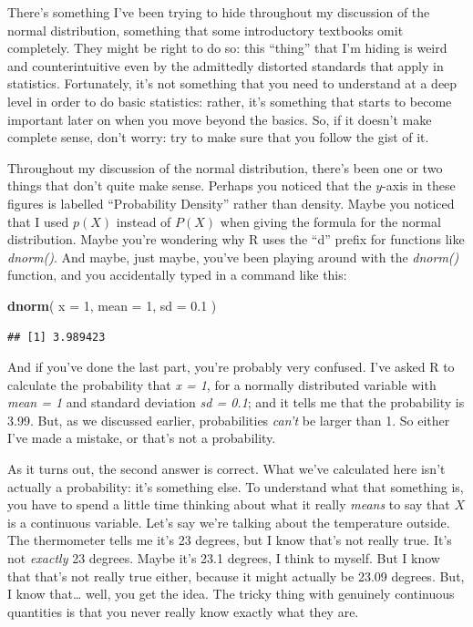 \documentclass[
]{book}
\newenvironment{Shaded}{\begin{snugshade}}{\end{snugshade}}
\newcommand{\AttributeTok}[1]{\textcolor[rgb]{0.13,0.29,0.53}{#1}}
\newcommand{\DecValTok}[1]{\textcolor[rgb]{0.00,0.00,0.81}{#1}}
\newcommand{\FloatTok}[1]{\textcolor[rgb]{0.00,0.00,0.81}{#1}}
\newcommand{\FunctionTok}[1]{\textcolor[rgb]{0.13,0.29,0.53}{\textbf{#1}}}
\newcommand{\NormalTok}[1]{#1}
\begin{document}
There's something I've been trying to hide throughout my discussion of the normal distribution, something that some introductory textbooks omit completely. They might be right to do so: this ``thing'' that I'm hiding is weird and counterintuitive even by the admittedly distorted standards that apply in statistics. Fortunately, it's not something that you need to understand at a deep level in order to do basic statistics: rather, it's something that starts to become important later on when you move beyond the basics. So, if it doesn't make complete sense, don't worry: try to make sure that you follow the gist of it.

Throughout my discussion of the normal distribution, there's been one or two things that don't quite make sense. Perhaps you noticed that the \(y\)-axis in these figures is labelled ``Probability Density'' rather than density. Maybe you noticed that I used \(p(X)\) instead of \(P(X)\) when giving the formula for the normal distribution. Maybe you're wondering why R uses the ``d'' prefix for functions like \emph{dnorm()}. And maybe, just maybe, you've been playing around with the \emph{dnorm()} function, and you accidentally typed in a command like this:

\begin{Shaded}
\begin{Highlighting}[]
\FunctionTok{dnorm}\NormalTok{( }\AttributeTok{x =} \DecValTok{1}\NormalTok{, }\AttributeTok{mean =} \DecValTok{1}\NormalTok{, }\AttributeTok{sd =} \FloatTok{0.1}\NormalTok{ )}
\end{Highlighting}
\end{Shaded}

\begin{verbatim}
## [1] 3.989423
\end{verbatim}

And if you've done the last part, you're probably very confused. I've asked R to calculate the probability that \emph{x = 1}, for a normally distributed variable with \emph{mean = 1} and standard deviation \emph{sd = 0.1}; and it tells me that the probability is 3.99. But, as we discussed earlier, probabilities \emph{can't} be larger than 1. So either I've made a mistake, or that's not a probability.

As it turns out, the second answer is correct. What we've calculated here isn't actually a probability: it's something else. To understand what that something is, you have to spend a little time thinking about what it really \emph{means} to say that \(X\) is a continuous variable. Let's say we're talking about the temperature outside. The thermometer tells me it's 23 degrees, but I know that's not really true. It's not \emph{exactly} 23 degrees. Maybe it's 23.1 degrees, I think to myself. But I know that that's not really true either, because it might actually be 23.09 degrees. But, I know that\ldots{} well, you get the idea. The tricky thing with genuinely continuous quantities is that you never really know exactly what they are.
\end{document}
